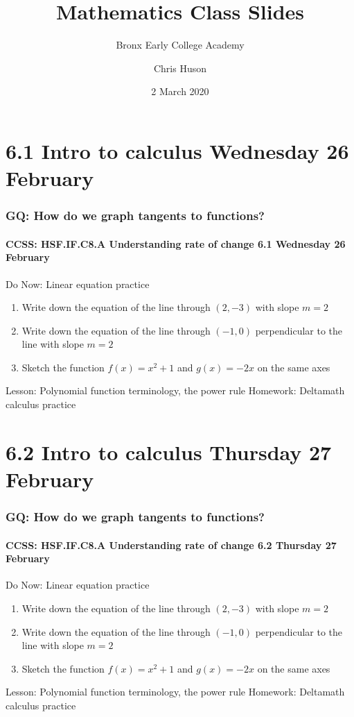 \documentclass{beamer}
\title{Mathematics Class Slides}
\subtitle{Bronx Early College Academy}
\author{Chris Huson}
\date{2 March 2020}
\begin{document}
\frame{\titlepage}
\section[Outline]{}
\frame{\tableofcontents}

\section{6.1 Intro to calculus \hfill Wednesday 26 February}
\frame
{
  \frametitle{GQ: How do we graph tangents to functions?}
  \framesubtitle{CCSS: HSF.IF.C8.A Understanding rate of change \hfill \alert{6.1 Wednesday 26 February}}
  \begin{block}{Do Now: Linear equation practice}
    \begin{enumerate}
      \item Write down the equation of the line through $(2,-3)$ with slope $m=2$
      \item Write down the equation of the line through $(-1,0)$ perpendicular to the line with slope $m=2$
      \item Sketch the function $f(x)=x^2+1$ and $g(x)=-2x$ on the same axes
    \end{enumerate}
    \end{block}
    Lesson: Polynomial function terminology, the power rule
    Homework: Deltamath calculus practice
    }

  \section{6.2 Intro to calculus \hfill Thursday 27 February}
  \frame
  {
    \frametitle{GQ: How do we graph tangents to functions?}
    \framesubtitle{CCSS: HSF.IF.C8.A Understanding rate of change \hfill \alert{6.2  Thursday 27 February}}
    \begin{block}{Do Now: Linear equation practice}
      \begin{enumerate}
        \item Write down the equation of the line through $(2,-3)$ with slope $m=2$
        \item Write down the equation of the line through $(-1,0)$ perpendicular to the line with slope $m=2$
        \item Sketch the function $f(x)=x^2+1$ and $g(x)=-2x$ on the same axes
      \end{enumerate}
      \end{block}
      Lesson: Polynomial function terminology, the power rule
      Homework: Deltamath calculus practice
      }
\end{document}
